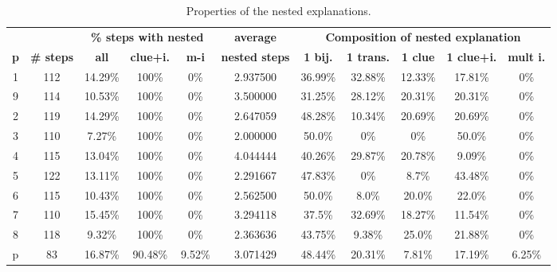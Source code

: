 \begin{table}[t]
	\centering
	\begin{tabular}{c|c|ccc|c|ccccc}
		           &                    &  \multicolumn{3}{c|}{\textbf{\% steps with nested}} & \multicolumn{1}{c|}{\textbf{average}} & \multicolumn{5}{c}{\textbf{Composition of nested explanation }}                                                                                       \\
		\textbf{p} & \textbf{\# steps } & \textbf{all}     & \textbf{clue+i.}                                & \textbf{m-i}          & \textbf{nested steps}                  & \textbf{1 bij.} & \textbf{1 trans.} & \textbf{1 clue} & \textbf{1 clue+i.} & \textbf{mult i.} \\\hline
		1 &      112 &  14.29\% &    100\% &     0\% &      2.937500 &  36.99\% &   32.88\% &  12.33\% &    17.81\% &       0\% \\
		9 &      114 &  10.53\% &    100\% &     0\% &      3.500000 &  31.25\% &   28.12\% &  20.31\% &    20.31\% &       0\% \\
		2 &      119 &  14.29\% &    100\% &     0\% &      2.647059 &  48.28\% &   10.34\% &  20.69\% &    20.69\% &       0\% \\
		3 &      110 &   7.27\% &    100\% &     0\% &      2.000000 &   50.0\% &       0\% &      0\% &     50.0\% &       0\% \\
		4 &      115 &  13.04\% &    100\% &     0\% &      4.044444 &  40.26\% &   29.87\% &  20.78\% &     9.09\% &       0\% \\
		5 &      122 &  13.11\% &    100\% &     0\% &      2.291667 &  47.83\% &       0\% &    8.7\% &    43.48\% &       0\% \\
		6 &      115 &  10.43\% &    100\% &     0\% &      2.562500 &   50.0\% &     8.0\% &   20.0\% &     22.0\% &       0\% \\
		7 &      110 &  15.45\% &    100\% &     0\% &      3.294118 &   37.5\% &   32.69\% &  18.27\% &    11.54\% &       0\% \\
		8 &      118 &   9.32\% &    100\% &     0\% &      2.363636 &  43.75\% &    9.38\% &   25.0\% &    21.88\% &       0\% \\
		p &       83 &  16.87\% &  90.48\% &  9.52\% &      3.071429 &  48.44\% &   20.31\% &   7.81\% &    17.19\% &    6.25\% \\
	\end{tabular}
	\caption{Properties of the nested explanations.}

	\label{table:nested_explanation}

\end{table}

